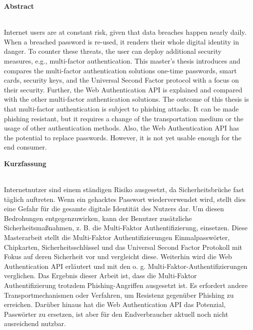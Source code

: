 \thispagestyle{noheader}
\setlength{\columnsep}{1cm}

{}

\begin{large}
	\textbf{Abstract} \\ \\
\end{large}
Internet users are at constant risk, given that data breaches happen nearly daily. When a breached password is re-used, it renders their whole digital identity in danger. To counter these threats, the user can deploy additional security measures, e.g., multi-factor authentication. This master's thesis introduces and compares the multi-factor authentication solutions one-time passwords, smart cards, security keys, and the Universal Second Factor protocol with a focus on their security. Further, the Web Authentication API is explained and compared with the other multi-factor authentication solutions. The outcome of this thesis is that multi-factor authentication is subject to phishing attacks. It can be made phishing resistant, but it requires a change of the transportation medium or the usage of other authentication methods. Also, the Web Authentication API has the potential to replace passwords. However, it is not yet usable enough for the end consumer.


\addvspace{0.7cm}

\begin{large}
	\textbf{Kurzfassung} \\ \\
\end{large}
Internetnutzer sind einem ständigen Risiko ausgesetzt, da Sicherheitsbrüche fast täglich auftreten. Wenn ein gehacktes Passwort wiederverwendet wird, stellt dies eine Gefahr für die gesamte digitale Identität des Nutzers dar. Um diesen Bedrohungen entgegenzuwirken, kann der Benutzer zusätzliche Sicherheitsmaßnahmen, z. B. die Multi-Faktor Authentifizierung, einsetzen. Diese Masterarbeit stellt die Multi-Faktor Authentifizierungen Einmalpasswörter, Chipkarten, Sicherheitsschlüssel und das Universal Second Factor Protokoll mit Fokus auf deren Sicherheit vor und vergleicht diese. Weiterhin wird die Web Authentication API erläutert und mit den o. g. Multi-Faktor-Authentifizierungen verglichen. Das Ergebnis dieser Arbeit ist, dass die Multi-Faktor Authentifizierung trotzdem Phishing-Angriffen ausgesetzt ist. Es erfordert andere Transportmechanismen oder Verfahren, um Resistenz gegenüber Phishing zu erreichen. Darüber hinaus hat die Web Authentication API das Potenzial, Passwörter zu ersetzen, ist aber für den Endverbraucher aktuell noch nicht ausreichend nutzbar.


\newpage